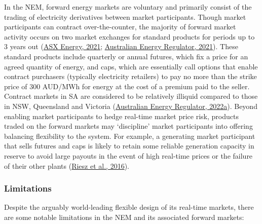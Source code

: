 \documentclass[12pt,a4paper,]{report}
\begin{document}
In the NEM, forward energy markets are voluntary and primarily consist
of the trading of electricity derivatives between market participants.
Though market participants can contract over-the-counter, the majority
of forward market activity occurs on two market exchanges for standard
products for periods up to 3 years out
(\protect\hyperlink{ref-asxenergyAustralianElectricityMarket2021}{ASX
Energy, 2021};
\protect\hyperlink{ref-australianenergyregulatorStateEnergyMarket2021}{Australian
Energy Regulator, 2021}). These standard products include quarterly or
annual futures, which fix a price for an agreed quantity of energy, and
caps, which are essentially call options that enable contract purchasers
(typically electricity retailers) to pay no more than the strike price
of 300 AUD/MWh for energy at the cost of a premium paid to the seller.
Contract markets in SA are considered to be relatively illiquid compared
to those in NSW, Queensland and Victoria
(\protect\hyperlink{ref-australianenergyregulatorStateEnergyMarket2022}{Australian
Energy Regulator, 2022a}). Beyond enabling market participants to hedge
real-time market price risk, products traded on the forward markets may
`discipline' market participants into offering balancing flexibility to
the system. For example, a generating market participant that sells
futures and caps is likely to retain some reliable generation capacity
in reserve to avoid large payouts in the event of high real-time prices
or the failure of their other plants
(\protect\hyperlink{ref-rieszAssessingViabilityEnergyonly2016}{Riesz et
al., 2016}).

\hypertarget{limitations}{%
\subsubsection{Limitations}\label{limitations}}

Despite the arguably world-leading flexible design of its real-time
markets, there are some notable limitations in the NEM and its
associated forward markets:
\end{document}
